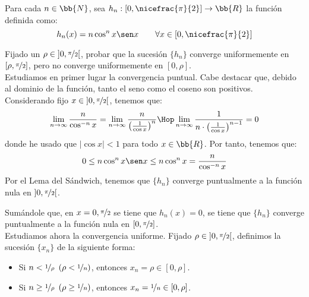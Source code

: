 \begin{ejercicio}
    Para cada $n\in \bb{N}$, sea $h_n:\left[0,\nicefrac{\pi}{2}\right]\to \bb{R}$ la función definida como:
    \begin{equation*}
        h_n(x) = n\cos^n x \sen x \qquad \forall x\in \left[0,\nicefrac{\pi}{2}\right]
    \end{equation*}

    Fijado un $\rho\in \left]0,\nicefrac{\pi}{2}\right[$, probar que la sucesión $\{h_n\}$ converge uniformemente en $[\rho,\nicefrac{\pi}{2}]$, pero no converge uniformemente en $\left[0,\rho\right]$.\\


    Estudiamos en primer lugar la convergencia puntual. Cabe destacar que, debido al 
    dominio de la función, tanto el seno como el coseno son positivos.
    Considerando fijo $x\in \left]0,\nicefrac{\pi}{2}\right[$, tenemos que:
    \begin{equation*}
        \lim_{n\to \infty} \frac{n}{\cos^{-n} x}
        = \lim_{n\to \infty} \frac{n}{\left(\frac{1}{\cos x}\right)^n}
        \Hop
        \lim_{n\to \infty} \frac{1}{n\cdot \left(\frac{1}{\cos x}\right)^{n-1}} = 0
    \end{equation*}
    donde he usado que $|\cos x|<1$ para todo $x\in \bb{R}$. Por tanto, tenemos que:
    \begin{equation*}
        0 \leq n\cos^n x \sen x \leq n\cos^n x = \frac{n}{\cos^{-n} x}
    \end{equation*}
    Por el Lema del Sándwich, tenemos que $\{h_n\}$ converge puntualmente a la función nula en $\left]0,\nicefrac{\pi}{2}\right[$.
    
    Sumándole que, en $x=0,\nicefrac{\pi}{2}$ se tiene que $h_n(x)=0$, se tiene que $\{h_n\}$ converge puntualmente a la función nula en $\left[0,\nicefrac{\pi}{2}\right]$.\\

    Estudiamos ahora la convergencia uniforme. Fijado $\rho\in \left]0,\nicefrac{\pi}{2}\right[$, definimos la sucesión $\{x_n\}$ de la siguiente forma:
    \begin{itemize}
        \item Si $n < \nicefrac{1}{\rho}~\left(\rho < \nicefrac{1}{n}\right)$, entonces $x_n = \rho \in [0, \rho]$.
        \item Si $n \geq \nicefrac{1}{\rho}~\left(\rho \geq \nicefrac{1}{n}\right)$, entonces $x_n = \nicefrac{1}{n}\in [0, \rho]$.
    \end{itemize}


\end{ejercicio}
